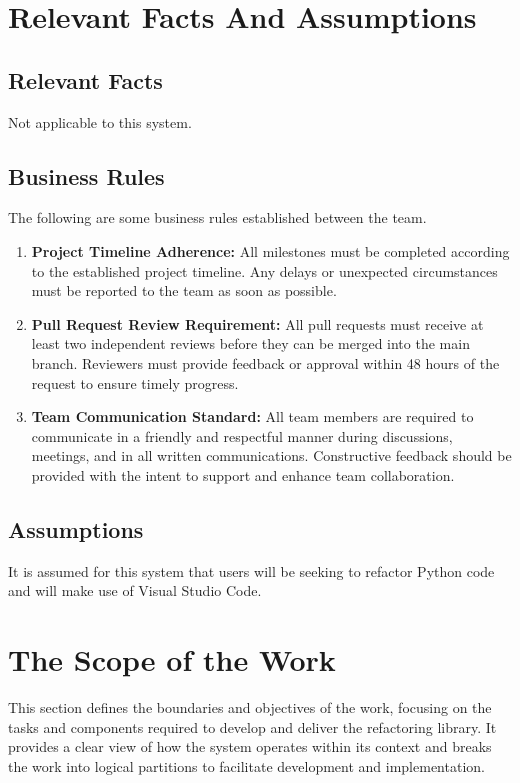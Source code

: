 \documentclass[12pt]{article}
\begin{document}
\section{Relevant Facts And Assumptions}
\subsection{Relevant Facts}
Not applicable to this system.
\subsection{Business Rules}

The following are some business rules established between the team.

\begin{enumerate}
  \item \textbf{Project Timeline Adherence:} All milestones must be
    completed according to the established project timeline. Any
    delays or unexpected circumstances must be reported to the team
    as soon as possible.
  \item \textbf{Pull Request Review Requirement:} All pull requests
    must receive at least two independent reviews before they can be
    merged into the main branch. Reviewers must provide feedback or
    approval within 48 hours of the request to ensure timely progress.
  \item \textbf{Team Communication Standard:} All team members are
    required to communicate in a friendly and respectful manner
    during discussions, meetings, and in all written communications.
    Constructive feedback should be provided with the intent to
    support and enhance team collaboration.
\end{enumerate}

\subsection{Assumptions}
It is assumed for this system that users will be seeking to refactor
Python code and will make use of Visual Studio Code.

\section{The Scope of the Work}
This section defines the boundaries and objectives of the work,
focusing on the tasks and components required to develop and deliver
the refactoring library. It provides a clear view of how the system
operates within its context and breaks the work into logical
partitions to facilitate development and implementation.
\end{document}
